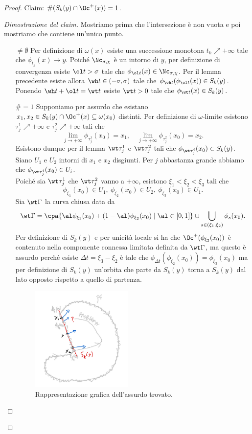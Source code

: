\begin{proof}
\noindent
\ul{Claim:} $\#(S_k(y)\cap \Oc^+(x))=1$.
\begin{proof}[Dimostrazione del claim]
Mostriamo prima che l'intersezione \`e non vuota e poi mostriamo che contiene un'unico punto.
\setlength{\leftmargini}{0cm}
\begin{itemize}
\item[$\boxed{\neq \emptyset}$] Per definizione di $\omega(x)$ esiste una successione monotona $t_k\nearrow +\infty$ tale che $\phi_{t_k}(x)\to y$. Poich\'e $\Nc_{\sigma,\chi}$ \`e un intorno di $y$, per definizione di convergenza esiste $\ol t>\sigma$ tale che $\phi_{\ol t}(x)\in \Nc_{\sigma,\chi}$. Per il lemma precedente esiste allora $\wh t\in (-\sigma,\sigma)$ tale che $\phi_{\wh t}(\phi_{\ol t}(x))\in S_k(y)$. Ponendo $\wh t+\ol t=\wt t$ esiste $\wt t>0$ tale che $\phi_{\wt t}(x)\in S_k(y)$.
\item[$\boxed{\#=1}$] Supponiamo per assurdo che esistano $x_1,x_2\in S_k(y)\cap \Oc^+(x)\subseteq \omega(x_0)$ distinti. Per definizione di $\omega$-limite esistono $\tau_{j}^1\nearrow+\infty$ e $\tau_{j}^2\nearrow+\infty$ tali che 
\[\lim_{j\to+\infty}\phi_{\tau^1_j}(x_0)=x_1,\quad \lim_{j\to+\infty}\phi_{\tau^2_j}(x_0)=x_2.\]
Esistono dunque per il lemma $\wt \tau^1_j$ e $\wt \tau^2_j$ tali che $\phi_{\wt \tau^i_j}(x_0)\in S_k(y)$. Siano $U_1$ e $U_2$ intorni di $x_1$ e $x_2$ disgiunti. Per $j$ abbastanza grande abbiamo che $\phi_{\wt \tau^i_j}(x_0)\in U_i$.\\
Poich\'e sia $\wt \tau_j^1$ che $\wt \tau_j^2$ vanno a $+\infty$, esistono $\xi_1<\xi_2<\xi_3$ tali che
\[\phi_{\xi_1}(x_0)\in U_1,\ \phi_{\xi_2}(x_0)\in U_2,\ \phi_{\xi_3}(x_0)\in U_1.\]
Sia $\wt \Gamma$ la curva chiusa data da
\[\wt \Gamma=\cpa{\al\phi_{\xi_1}(x_0)+(1-\al)\phi_{\xi_2}(x_0)\mid \al\in [0,1]}\cup \bigcup_{s\in (\xi_1,\xi_2)}\phi_s(x_0).\]
Per definizione di $S_k(y)$ e per unicit\`a locale si ha che $\Oc^+(\phi_{\xi_2}(x_0))$ \`e contenuto nella componente connessa limitata definita da $\wt \Gamma$, ma questo \`e assurdo perch\'e esiste $\Delta t=\xi_3-\xi_2$ \`e tale che $\phi_{\Delta t}(\phi_{\xi_2}(x_0))=\phi_{\xi_3}(x_0)$ ma per definizione di $S_k(y)$ un'orbita che parte da $S_k(y)$ torna a $S_k(y)$ dal lato opposto rispetto a quello di partenza.
\begin{figure}[!htb]
    \centering
    \includegraphics[width=5cm]{Immagini/poincare_bendixon.png}
    \caption{Rappresentazione grafica dell'assurdo trovato.}
\end{figure}


\end{itemize}
\end{proof}
\end{proof}

